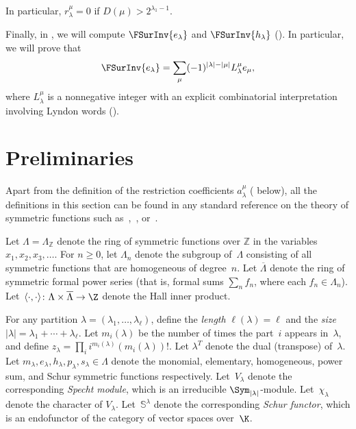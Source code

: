 In particular, $r_{\lambda}^\mu = 0$ if $D(\mu) > 2^{\lambda_1 - 1}$.

Finally, in , we will compute $\FSurInv{e_\lambda}$ and $\FSurInv{h_\lambda}$ (). In particular, we will prove that \[\FSurInv{e_\lambda} = \sum_{\mu} (-1)^{|\lambda| - |\mu|} L_\lambda^\mu e_\mu,\] where $L_\lambda^\mu$ is a nonnegative integer with an explicit combinatorial interpretation involving Lyndon words ().

\section{Preliminaries}\label{section:preliminaries}
Apart from the definition of the restriction coefficients $a_\lambda^\mu$ ( below), all the definitions in this section can be found in any standard reference on the theory of symmetric functions such as~\cite{MR1464693},~\cite[Chapter~I]{MR3443860}, or~\cite[Chapter~7]{MR4621625}.

Let $\Lambda = \Lambda_\mathbb{Z}$ denote the ring of symmetric functions over $\mathbb{Z}$ in the variables $x_1, x_2, x_3, \ldots$. For $n \geq 0$, let $\Lambda_n$ denote the subgroup of~$\Lambda$ consisting of all symmetric functions that are homogeneous of degree~$n$. Let $\overline{\Lambda}$ denote the ring of symmetric formal power series (that is, formal sums $\sum_{n} f_n$, where each $f_n \in \Lambda_n$). Let~$\langle \cdot, \cdot \rangle \colon \Lambda \times \overline{\Lambda} \to \Z$ denote the Hall inner product.

For any partition $\lambda = (\lambda_1, \ldots, \lambda_\ell)$, define the \emph{length} $\ell(\lambda) = \ell$ and the \emph{size} $|\lambda| = \lambda_1 + \cdots + \lambda_\ell$. Let $m_i(\lambda)$ be the number of times the part~$i$ appears in~$\lambda$, and define $z_\lambda = \prod_i i^{m_i(\lambda)} (m_i(\lambda))!$. Let $\lambda^T$ denote the dual (\ie transpose) of~$\lambda$. Let $m_\lambda, e_\lambda, h_\lambda, p_\lambda, s_\lambda \in \Lambda$ denote the monomial, elementary, homogeneous, power sum, and Schur symmetric functions respectively. Let~$V_\lambda$ denote the corresponding \emph{Specht module}, which is an irreducible $\Sym_{|\lambda|}$-module. Let~$\chi_\lambda$ denote the character of $V_\lambda$. Let~$\mathbb{S}^\lambda$ denote the corresponding \emph{Schur functor}, which is an endofunctor of the category of vector spaces over~$\K$.

